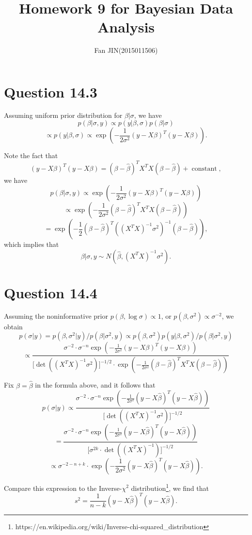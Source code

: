 \documentclass{article}
\DeclareMathOperator*{\const}{constant}
\begin{document}
\title{\textsf{Homework 9 for Bayesian Data Analysis}}
\author{Fan JIN\quad (2015011506)}
\maketitle

\section*{Question 14.3}
{
    Assuming uniform prior distribution for $\beta|\sigma$, we have
    $$p(\beta|\sigma, y) \propto p(y | \beta, \sigma) p(\beta | \sigma)$$
    $$\propto p(y | \beta, \sigma) \propto \exp{\left( -\frac{1}{2\sigma^2} (y-X\beta)^T (y-X\beta) \right)}.$$

    Note the fact that $$(y-X\beta)^T (y-X\beta) = (\beta-\hat{\beta})^T X^T X (\beta-\hat{\beta}) + \const,$$ we have
    $$p(\beta|\sigma, y) \propto \exp{\left( -\frac{1}{2\sigma^2} (y-X\beta)^T (y-X\beta) \right)}$$
    $$\propto \exp{\left( -\frac{1}{2\sigma^2} (\beta-\hat{\beta})^T X^T X (\beta-\hat{\beta}) \right)}$$
    $$= \exp{\left( -\frac{1}{2} (\beta-\hat{\beta})^T ((X^T X)^{-1} \sigma^2)^{-1} (\beta-\hat{\beta}) \right)},$$
    which implies that $$\beta | \sigma, y \sim N(\hat{\beta}, (X^T X)^{-1} \sigma^2).$$
}

\section*{Question 14.4}
{
    Assuming the noninformative prior $p(\beta, \log{\sigma}) \propto 1$, or $p(\beta, \sigma^2) \propto \sigma^{-2}$, we obtain
    $$p(\sigma | y) = p(\beta, \sigma^2 | y) / p(\beta | \sigma^2, y) \propto p(\beta, \sigma^2) p(y | \beta, \sigma^2) / p(\beta | \sigma^2, y)$$
    $$\propto \frac{\sigma^{-2} \cdot \sigma^{-n} \exp{\left( -\frac{1}{2\sigma^2} (y-X\beta)^T (y-X\beta) \right)}}{[\det{((X^T X)^{-1} \sigma^2)]^{-1/2} \cdot \exp{\left( -\frac{1}{2\sigma^2} (\beta-\hat{\beta})^T X^T X (\beta-\hat{\beta}) \right)}}}$$

    Fix $\beta = \hat{\beta}$ in the formula above, and it follows that
    $$p(\sigma | y) \propto \frac{\sigma^{-2} \cdot \sigma^{-n} \exp{\left( -\frac{1}{2\sigma^2} (y-X\hat{\beta})^T (y-X\hat{\beta}) \right)}}{[\det{((X^T X)^{-1} \sigma^2)]^{-1/2}}}$$
    $$= \frac{\sigma^{-2} \cdot \sigma^{-n} \exp{\left( -\frac{1}{2\sigma^2} (y-X\hat{\beta})^T (y-X\hat{\beta}) \right)}}{[\sigma^{2k} \cdot \det{((X^T X)^{-1})]^{-1/2}}}$$
    $$\propto \sigma^{-2-n+k} \cdot \exp{\left( -\frac{1}{2\sigma^2} (y-X\hat{\beta})^T (y-X\hat{\beta}) \right)}.$$

    Compare this expression to the Inverse-$\chi^2$ distribution\footnote{https://en.wikipedia.org/wiki/Inverse-chi-squared\_distribution}, we find that 
    $$s^2 = \frac{1}{n-k} (y-X\hat{\beta})^T (y-X\hat{\beta}).$$
}
\end{document}
